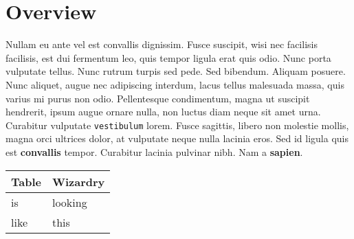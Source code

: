 \section{Overview}\label{overview}

Nullam eu ante vel est convallis dignissim. Fusce suscipit, wisi nec
facilisis facilisis, est dui fermentum leo, quis tempor ligula erat quis
odio. Nunc porta vulputate tellus. Nunc rutrum turpis sed pede. Sed
bibendum. Aliquam posuere. Nunc aliquet, augue nec adipiscing interdum,
lacus tellus malesuada massa, quis varius mi purus non odio.
Pellentesque condimentum, magna ut suscipit hendrerit, ipsum augue
ornare nulla, non luctus diam neque sit amet urna. Curabitur vulputate
\texttt{vestibulum} lorem. Fusce sagittis, libero non molestie mollis,
magna orci ultrices dolor, at vulputate neque nulla lacinia eros. Sed id
ligula quis est \textbf{convallis} tempor. Curabitur lacinia pulvinar
nibh. Nam a \textbf{sapien}.

\begin{longtable}[]{@{}ll@{}}
\toprule
Table & Wizardry\tabularnewline
\midrule
\endhead
is & looking\tabularnewline
like & this\tabularnewline
\bottomrule
\end{longtable}
